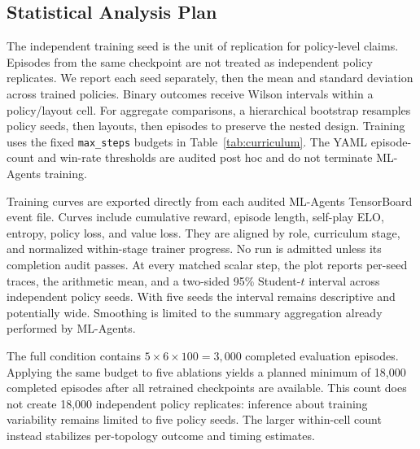 \documentclass[journal]{IEEEtran}
\begin{document}
\subsection{Statistical Analysis Plan}

The independent training seed is the unit of replication for policy-level claims. Episodes from the same checkpoint are not treated as independent policy replicates. We report each seed separately, then the mean and standard deviation across trained policies. Binary outcomes receive Wilson intervals within a policy/layout cell. For aggregate comparisons, a hierarchical bootstrap resamples policy seeds, then layouts, then episodes to preserve the nested design. Training uses the fixed \texttt{max\_steps} budgets in Table~\ref{tab:curriculum}. The YAML episode-count and win-rate thresholds are audited post hoc and do not terminate ML-Agents training.

Training curves are exported directly from each audited ML-Agents TensorBoard event file. Curves include cumulative reward, episode length, self-play ELO, entropy, policy loss, and value loss. They are aligned by role, curriculum stage, and normalized within-stage trainer progress. No run is admitted unless its completion audit passes. At every matched scalar step, the plot reports per-seed traces, the arithmetic mean, and a two-sided 95\% Student-$t$ interval across independent policy seeds. With five seeds the interval remains descriptive and potentially wide. Smoothing is limited to the summary aggregation already performed by ML-Agents.

The full condition contains $5\times6\times100=3{,}000$ completed evaluation episodes. Applying the same budget to five ablations yields a planned minimum of 18,000 completed episodes after all retrained checkpoints are available. This count does not create 18,000 independent policy replicates: inference about training variability remains limited to five policy seeds. The larger within-cell count instead stabilizes per-topology outcome and timing estimates.
\end{document}
